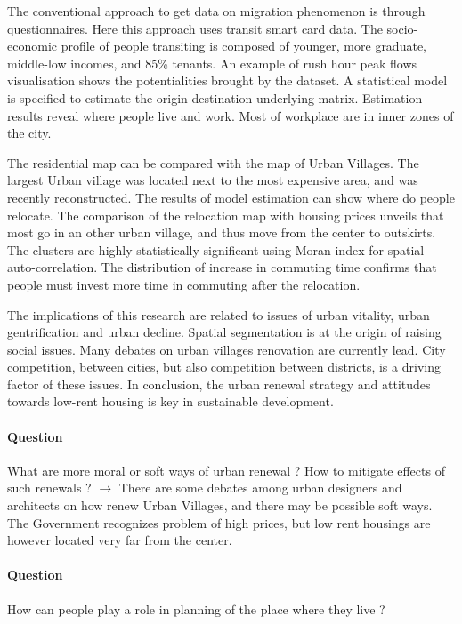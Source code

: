 \documentclass[10pt]{article}
\begin{document}
The conventional approach to get data on migration phenomenon is through questionnaires. Here this approach uses transit smart card data. The socio-economic profile of people transiting is composed of younger, more graduate, middle-low incomes, and 85\% tenants. An example of rush hour peak flows visualisation shows the potentialities brought by the dataset. A statistical model is specified to estimate the origin-destination underlying matrix. Estimation results reveal where people live and work. Most of workplace are in inner zones of the city.

The residential map can be compared with the map of Urban Villages. The largest Urban village was located next to the most expensive area, and was recently reconstructed. The results of model estimation can show where do people relocate. The comparison of the relocation map with housing prices unveils that most go in an other urban village, and thus move from the center to outskirts. The clusters are highly statistically significant using Moran index for spatial auto-correlation. The distribution of increase in commuting time confirms that people must invest more time in commuting after the relocation.

The implications of this research are related to issues of urban vitality, urban gentrification and urban decline. Spatial segmentation is at the origin of raising social issues. Many debates on urban villages renovation are currently lead. City competition, between cities, but also competition between districts, is a driving factor of these issues. In conclusion, the urban renewal strategy and attitudes towards low-rent housing is key in sustainable development.


\paragraph{Question}

What are more moral or soft ways of urban renewal ? How to mitigate effects of such renewals ? $\rightarrow$ There are some debates among urban designers and architects on how renew Urban Villages, and there may be possible soft ways. The Government recognizes problem of high prices, but low rent housings are however located very far from the center.


\paragraph{Question}

How can people play a role in planning of the place where they live ?
\end{document}
